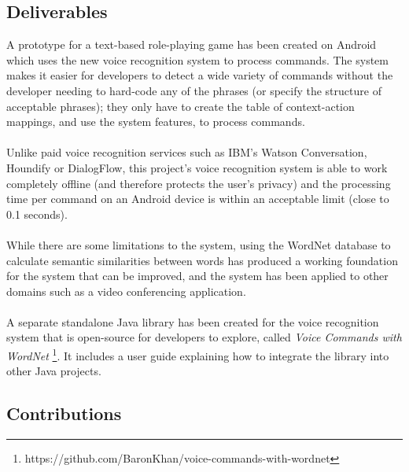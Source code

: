 \documentclass[11pt]{article}
\begin{document}
\subsection{Deliverables}
\label{section:deliverables}

A prototype for a text-based role-playing game has been created on Android which uses the new voice recognition system to process commands. The system makes it easier for developers to detect a wide variety of commands without the developer needing to hard-code any of the phrases (or specify the structure of acceptable phrases); they only have to create the table of context-action mappings, and use the system features, to process commands.
\\
\\
Unlike paid voice recognition services such as IBM's Watson Conversation, Houndify or DialogFlow, this project's voice recognition system is able to work completely offline (and therefore protects the user's privacy) and the processing time per command on an Android device is within an acceptable limit (close to 0.1 seconds).
\\
\\
While there are some limitations to the system, using the WordNet database to calculate semantic similarities between words has produced a working foundation for the system that can be improved, and the system has been applied to other domains such as a video conferencing application.
\\
\\
A separate standalone Java library has been created for the voice recognition system that is open-source for developers to explore, called \textit{Voice Commands with WordNet} \footnote{https://github.com/BaronKhan/voice-commands-with-wordnet}. It includes a user guide explaining how to integrate the library into other Java projects.

\subsection{Contributions}
\label{section:contributions}
\end{document}
